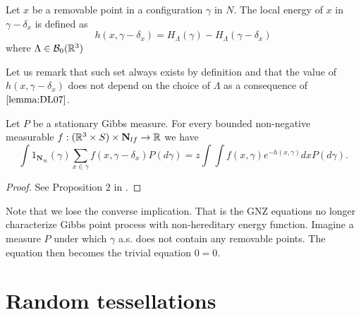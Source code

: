 \begin{definition}
	Let $x$ be a removable point in a configuration $\gamma$ in $N$. The local energy of $x$ in $\gamma - \delta_x$ is defined as
	$$h(x,\gamma - \delta_x) = H_\Lambda (\gamma) - H_\Lambda(\gamma - \delta_x)$$
	where $\Lambda \in \mathcal B_0({\mathbb R^3})$
\end{definition}
Let us remark that such set always exists by definition and that the value of $h(x,\gamma-\delta_x)$ does not depend on the choice of $\Lambda$ as a consequence of $\ref{lemma:DL07}$.


\begin{proposition}
	Let $P$ be a stationary Gibbs measure. For every bounded non-negative measurable $f:({\mathbb R^3}\times S) \times \mathbf N_{lf}\to\mathbb R$ we have
	$$\int 1_{\mathbf N_\infty}(\gamma) \sum_{x \in \gamma} f(x,\gamma -\delta_x) P(d\gamma) = z \int \int f(x,\gamma)e^{-h(x,\gamma)} dx P(d\gamma).$$
\end{proposition}
\begin{proof}
	See Proposition $2$ in \cite{DereudreLavancier2007}.
\end{proof}

Note that we lose the converse implication. That is the GNZ equations no longer characterize Gibbs point process with non-hereditary energy function. Imagine a measure $P$ under which $\gamma$ a.s. does not contain any removable points. The equation then becomes the trivial equation $0=0$.





\section{Random tessellations}
